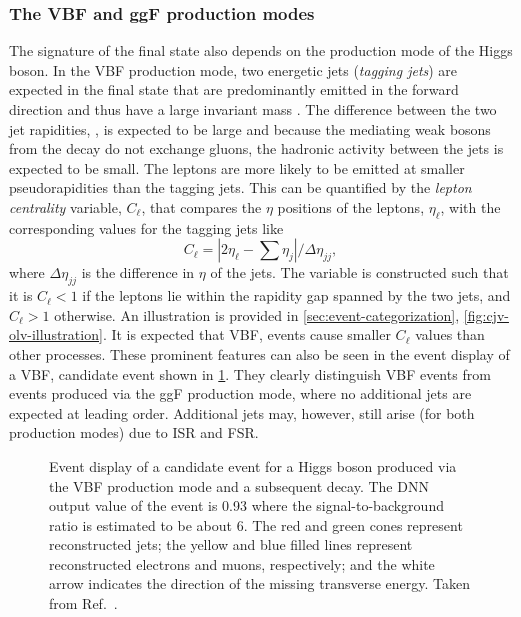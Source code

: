 \subsubsection{The VBF and ggF production modes}
The signature of the final state also depends on the production mode of the Higgs boson.
In the VBF production mode, two energetic jets (\emph{tagging jets}) are expected in the final state that are predominantly emitted in the forward direction and thus have a large invariant mass \mjj. 
The difference between the two jet rapidities, \dyjj, is expected to be large and because the mediating weak bosons from the \HWW decay do not exchange gluons, the hadronic activity between the jets is expected to be small. 
The leptons are more likely to be emitted at smaller pseudorapidities than the tagging jets. This can be quantified by the \emph{lepton centrality} variable, $C_\ell$, that compares the $\eta$ positions of the leptons, $\eta_\ell$, with the corresponding values for the tagging jets like
\begin{equation}
    C_\ell = |2\eta_\ell - \sum \eta_j| / \Delta \eta_{jj},
\end{equation}
where $\Delta \eta_{jj}$ is the difference in $\eta$ of the jets. 
The variable is constructed such that it is $C_\ell < 1$ if the leptons lie within the rapidity gap spanned by the two jets, and $C_\ell > 1$ otherwise. An illustration is provided in \cref{sec:event-categorization}, \cref{fig:cjv-olv-illustration}. 
It is expected that VBF, \HWW events cause smaller $C_\ell$ values than other processes.
These prominent features can also be seen in the event display of a VBF, \HWW candidate event shown in \cref{fig:vbf-event-display}. 
They clearly distinguish VBF events from events produced via the ggF production mode, where no additional jets are expected at leading order. 
Additional jets may, however, still arise (for both production modes) due to ISR and FSR. 

\begin{figure}
    {}
    {}
    \caption[Event display of a candidate event for a Higgs boson produced via the VBF production mode and a subsequent \HWWdet decay.]{Event display of a candidate event for a Higgs boson produced via the VBF production mode and a subsequent \HWWdet decay. The DNN output value of the event is 0.93 where the signal-to-background ratio is estimated to be about 6. 
    The red and green cones represent reconstructed jets; the yellow and blue filled lines represent reconstructed electrons and muons, respectively; and the white arrow indicates the direction of the missing transverse energy. 
    Taken from Ref.~\cite{HWWPaper}.}
    \label{fig:vbf-event-display}
\end{figure}

